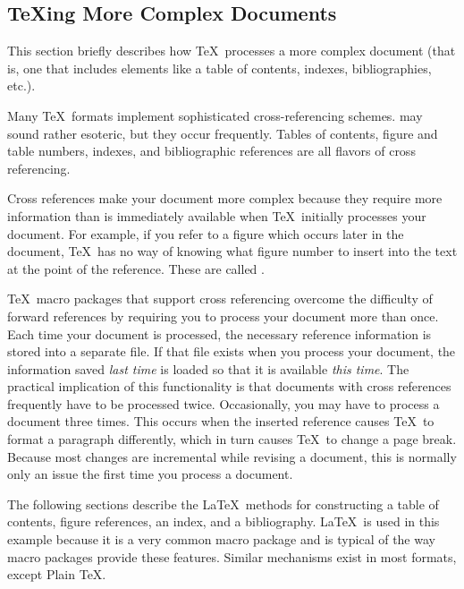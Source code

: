 \subsection{\protect\TeX{}ing More Complex Documents}

This section briefly describes how \TeX\ processes a more complex
document (that is, one that includes elements like a
table of contents, indexes, bibliographies, etc.).

Many \TeX\ formats implement sophisticated cross-referencing schemes.  
 may sound 
rather esoteric, but they occur
frequently.  Tables of contents, figure and table numbers, indexes,
and bibliographic references are all flavors of cross referencing.

Cross references make your document more complex because they require more
information than is immediately available when \TeX\ initially
processes your document.
For example, if you refer to a figure which occurs later in the document,
\TeX\ has no way of knowing what figure number to insert into the text at the
point of the reference.  These are called .

\TeX\ macro packages that support cross referencing overcome the difficulty of
forward references by requiring you to process your document more than once.
Each time your document is processed, the necessary reference information is
stored into a separate file.  If that file exists when you process your
document, the information saved {\em last time\/} is loaded so that it is
available {\em this time}.  The practical implication of this functionality is
that documents with cross references frequently have to be processed twice.
Occasionally, you may have to process a document three times.  This occurs
when the inserted reference causes \TeX\ to format a paragraph differently,
which in turn causes \TeX\ to change a page break.  Because most changes  are incremental
while revising
a document,
this is normally only an issue the first
time you process a document.

The following sections describe the \LaTeX\ methods for constructing a
table of contents, figure references, an index, and a bibliography.
\LaTeX\ is used in this example because it is a very common macro
package and is typical of the way macro packages provide these
features.  Similar mechanisms exist in most formats, except Plain \TeX.


